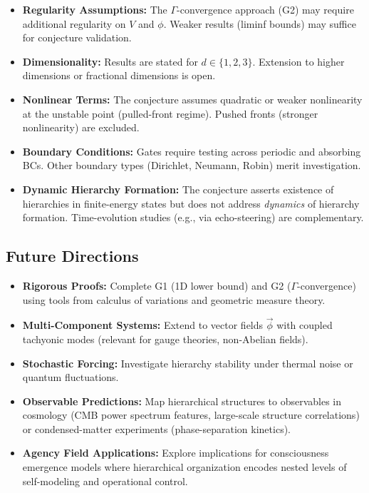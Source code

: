 \documentclass{article}
\begin{document}
\begin{itemize}[noitemsep]
\item \textbf{Regularity Assumptions:} The $\Gamma$-convergence approach (G2) may require additional regularity on $V$ and $\phi$. Weaker results (liminf bounds) may suffice for conjecture validation.
\item \textbf{Dimensionality:} Results are stated for $d \in \{1,2,3\}$. Extension to higher dimensions or fractional dimensions is open.
\item \textbf{Nonlinear Terms:} The conjecture assumes quadratic or weaker nonlinearity at the unstable point (pulled-front regime). Pushed fronts (stronger nonlinearity) are excluded.
\item \textbf{Boundary Conditions:} Gates require testing across periodic and absorbing BCs. Other boundary types (Dirichlet, Neumann, Robin) merit investigation.
\item \textbf{Dynamic Hierarchy Formation:} The conjecture asserts existence of hierarchies in finite-energy states but does not address \emph{dynamics} of hierarchy formation. Time-evolution studies (e.g., via echo-steering) are complementary.
\end{itemize}

\subsection*{Future Directions}

\begin{itemize}[noitemsep]
\item \textbf{Rigorous Proofs:} Complete G1 (1D lower bound) and G2 ($\Gamma$-convergence) using tools from calculus of variations and geometric measure theory.
\item \textbf{Multi-Component Systems:} Extend to vector fields $\vec{\phi}$ with coupled tachyonic modes (relevant for gauge theories, non-Abelian fields).
\item \textbf{Stochastic Forcing:} Investigate hierarchy stability under thermal noise or quantum fluctuations.
\item \textbf{Observable Predictions:} Map hierarchical structures to observables in cosmology (CMB power spectrum features, large-scale structure correlations) or condensed-matter experiments (phase-separation kinetics).
\item \textbf{Agency Field Applications:} Explore implications for consciousness emergence models where hierarchical organization encodes nested levels of self-modeling and operational control.
\end{itemize}
\end{document}
